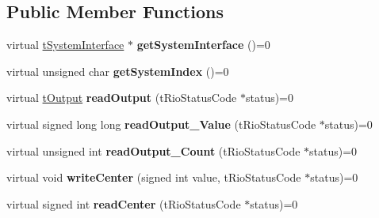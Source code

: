 \subsection*{Public Member Functions}
\begin{DoxyCompactItemize}
\item 
\hypertarget{classnFPGA_1_1nFRC__2012__1__6__4_1_1tAccumulator_af4f19b9e0f63a57d7d0e717601fde476}{
virtual \hyperlink{classnFPGA_1_1tSystemInterface}{tSystemInterface} $\ast$ {\bfseries getSystemInterface} ()=0}
\label{classnFPGA_1_1nFRC__2012__1__6__4_1_1tAccumulator_af4f19b9e0f63a57d7d0e717601fde476}

\item 
\hypertarget{classnFPGA_1_1nFRC__2012__1__6__4_1_1tAccumulator_ad1aaba6fedf5195aee6abab5887bf07a}{
virtual unsigned char {\bfseries getSystemIndex} ()=0}
\label{classnFPGA_1_1nFRC__2012__1__6__4_1_1tAccumulator_ad1aaba6fedf5195aee6abab5887bf07a}

\item 
\hypertarget{classnFPGA_1_1nFRC__2012__1__6__4_1_1tAccumulator_a32ae5fcc8d6cc004004b2a18a773a06f}{
virtual \hyperlink{unionnFPGA_1_1nFRC__2012__1__6__4_1_1tAccumulator_1_1tOutput}{tOutput} {\bfseries readOutput} (tRioStatusCode $\ast$status)=0}
\label{classnFPGA_1_1nFRC__2012__1__6__4_1_1tAccumulator_a32ae5fcc8d6cc004004b2a18a773a06f}

\item 
\hypertarget{classnFPGA_1_1nFRC__2012__1__6__4_1_1tAccumulator_a7141aeac4a36b5afff09ba36902ee671}{
virtual signed long long {\bfseries readOutput\_\-Value} (tRioStatusCode $\ast$status)=0}
\label{classnFPGA_1_1nFRC__2012__1__6__4_1_1tAccumulator_a7141aeac4a36b5afff09ba36902ee671}

\item 
\hypertarget{classnFPGA_1_1nFRC__2012__1__6__4_1_1tAccumulator_a68de7c6d9ca7782da68dd9b445196036}{
virtual unsigned int {\bfseries readOutput\_\-Count} (tRioStatusCode $\ast$status)=0}
\label{classnFPGA_1_1nFRC__2012__1__6__4_1_1tAccumulator_a68de7c6d9ca7782da68dd9b445196036}

\item 
\hypertarget{classnFPGA_1_1nFRC__2012__1__6__4_1_1tAccumulator_aeeca574573489e46aee0c8afdda9956a}{
virtual void {\bfseries writeCenter} (signed int value, tRioStatusCode $\ast$status)=0}
\label{classnFPGA_1_1nFRC__2012__1__6__4_1_1tAccumulator_aeeca574573489e46aee0c8afdda9956a}

\item 
\hypertarget{classnFPGA_1_1nFRC__2012__1__6__4_1_1tAccumulator_af6f2d9a27417846113c82481f70082c5}{
virtual signed int {\bfseries readCenter} (tRioStatusCode $\ast$status)=0}
\label{classnFPGA_1_1nFRC__2012__1__6__4_1_1tAccumulator_af6f2d9a27417846113c82481f70082c5}


\end{DoxyCompactItemize}
